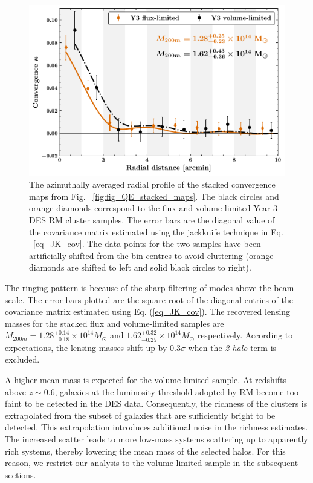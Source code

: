 \begin{figure}[ht]
\includegraphics[width=\linewidth]{figs/kappa_model_MF_y3_v6_4_22_full_vl_radprf_JODY.pdf}
\caption{The azimuthally averaged radial profile of the stacked convergence maps from Fig. ~\ref{fig:fig_QE_stacked_maps}. The black circles and orange diamonds correspond to the flux and volume-limited Year-3 DES RM cluster samples. The error bars are the diagonal value of the covariance matrix estimated using the jackknife technique in Eq. ~\ref{eq_JK_cov}. The data points for the two samples have been artificially shifted from the bin centres to avoid cluttering (orange diamonds are shifted to left and solid black circles to right). }
\label{fig:avg_fig_QE_stacked_maps}
\end{figure}

The ringing pattern is because of the sharp filtering of modes above the \sptpol{} beam scale. 
The error bars plotted are the square root of the diagonal entries of the covariance matrix estimated using Eq. (\ref{eq_JK_cov}). 
The recovered lensing masses for the stacked flux and volume-limited samples are $M_{200m} = 1.28^{+0.14}_{-0.18} \times 10^{14} M_{\odot}$ and $1.62^{+0.32}_{-0.25} \times 10^{14} M_{\odot}$ respectively. %
According to expectations, the lensing masses shift up by 0.3$\sigma$ when the {\it 2-halo} term is excluded.


A higher mean mass is expected for the volume-limited sample. 
At redshifts above $z\sim 0.6$, galaxies at the luminosity threshold adopted by RM become too faint to be detected in the DES data. 
Consequently, the richness of the clusters is extrapolated from the subset of galaxies that are sufficiently bright to be detected. 
This extrapolation introduces additional noise in the richness estimates.
The increased scatter leads to more low-mass systems scattering up to apparently rich systems, thereby lowering the mean mass of the selected halos. 
For this reason, we restrict our analysis to the volume-limited sample in the subsequent sections. 
